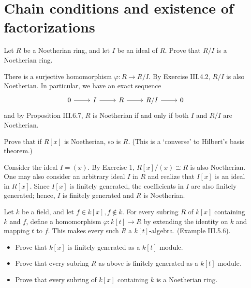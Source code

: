 \documentclass[../../master.tex]{subfiles}
\begin{document}
\section{Chain conditions and existence of factorizations}

    \begin{problem}
        Let $R$ be a Noetherian ring, and let $I$ be an ideal of $R$. Prove that
        $R / I$ is a Noetherian ring.
    \end{problem}

    \begin{solution}
        There is a surjective homomorphism $\varphi : R \to R / I$. By Exercise
        III.4.2, $R / I$ is also Noetherian. In particular, we have an exact
        sequence
        \[
        \begin{tikzcd}
            0 & I & R & {R / I} & 0
            \arrow[from=1-1, to=1-2]
            \arrow[from=1-2, to=1-3]
            \arrow[from=1-3, to=1-4]
            \arrow[from=1-4, to=1-5]
        \end{tikzcd}
        \] 
        and by Proposition III.6.7, $R$ is Noetherian if and only if both $I$
        and $R / I$ are Noetherian.
    \end{solution}

    \begin{problem}
        Prove that if $R[x]$ is Noetherian, so is $R$. (This is a `converse' to
        Hilbert's basis theorem.)
    \end{problem}

    \begin{solution}
        Consider the ideal $I = (x)$. By Exercise 1, $R[x] / (x) \cong R$ is
        also Noetherian. One may also consider an arbitrary ideal $I$ in $R$ and
        realize that $I[x]$ is an ideal in $R[x]$. Since $I[x]$ is finitely
        generated, the coefficients in $I$ are also finitely generated; hence,
        $I$ is finitely generated and $R$ is Noetherian.
    \end{solution}

    \begin{problem}
        Let $k$ be a field, and let $f \in k[x], f \notin k$. For every subring
        $R$ of $k[x]$ containing $k$ and $f$, define a homomorphism $\varphi:
        k[t] \to R$ by extending the identity on $k$ and mapping $t$ to $f$.
        This makes every such $R$ a $k[t]$-algebra. (Example III.5.6).
        \begin{itemize}
            \item Prove that $k[x]$ is finitely generated as a $k[t]$-module.
            \item Prove that every subring $R$ as above is finitely generated as
                a $k[t]$-module.
            \item Prove that every subring of $k[x]$ containing $k$ is a
                Noetherian ring.
        \end{itemize}
    \end{problem}
\end{document}
